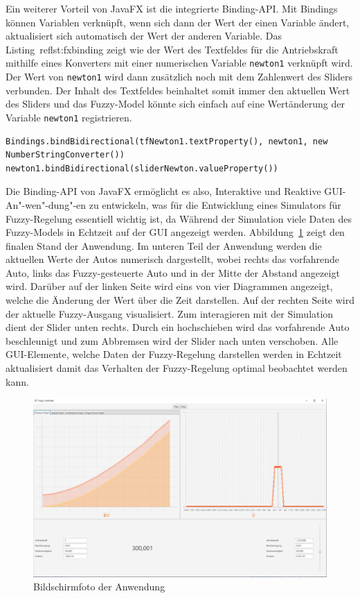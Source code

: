 \documentclass[12pt,a4paper,bibliography=totocnumbered,listof=totocnumbered, abstracton]{scrartcl}
\theoremstyle{Umgebung}
\begin{document}
Ein weiterer Vorteil von JavaFX ist die integrierte Binding-API. Mit Bindings können Variablen verknüpft, wenn sich dann der Wert der einen Variable ändert, aktualisiert sich automatisch der Wert der anderen Variable. Das Listing~ref{lst:fxbinding} zeigt wie der Wert des Textfeldes für die Antriebskraft mithilfe eines Konverters mit einer numerischen Variable \lstinline|newton1| verknüpft wird. Der Wert von \lstinline|newton1| wird dann zusätzlich noch mit dem Zahlenwert des Sliders verbunden. Der Inhalt des Textfeldes beinhaltet somit immer den aktuellen Wert des Sliders und das Fuzzy-Model könnte sich einfach auf eine Wertänderung der Variable \lstinline|newton1| registrieren.

\begin{lstlisting}[firstnumber=114, style=myScalastyle, caption={Binding, der Wert des Sliders wird mit dem des Textfeldes verknüpft}, label=lst:fxbinding]
Bindings.bindBidirectional(tfNewton1.textProperty(), newton1, new NumberStringConverter())
newton1.bindBidirectional(sliderNewton.valueProperty())
\end{lstlisting}

Die Binding-API von JavaFX ermöglicht es also, Interaktive und Reaktive GUI-An"-wen"-dung"-en zu entwickeln, was für die Entwicklung eines Simulators für Fuzzy-Regelung essentiell wichtig ist, da Während der Simulation viele Daten des Fuzzy-Models in Echtzeit auf der GUI angezeigt werden.
Abbildung~\ref{fig:screenshot} zeigt den finalen Stand der Anwendung. Im unteren Teil der Anwendung werden die aktuellen Werte der Autos numerisch dargestellt, wobei rechts das vorfahrende Auto, links das Fuzzy-gesteuerte Auto und in der Mitte der Abstand angezeigt wird. Darüber auf der linken Seite wird eins von vier Diagrammen angezeigt, welche die Änderung der Wert über die Zeit darstellen. Auf der rechten Seite wird der aktuelle Fuzzy-Ausgang visualisiert. Zum interagieren mit der Simulation dient der Slider unten rechts. Durch ein hochschieben wird das vorfahrende Auto beschleunigt und zum Abbremsen wird der Slider nach unten verschoben. Alle GUI-Elemente, welche Daten der Fuzzy-Regelung darstellen werden in Echtzeit aktualisiert damit das Verhalten der Fuzzy-Regelung optimal beobachtet werden kann.

\begin{figure}
	\centering
	\includegraphics[width=1\textwidth]{img/practical/mainView}
	\caption{Bildschirmfoto der Anwendung}
	\label{fig:screenshot}
\end{figure}
\end{document}
